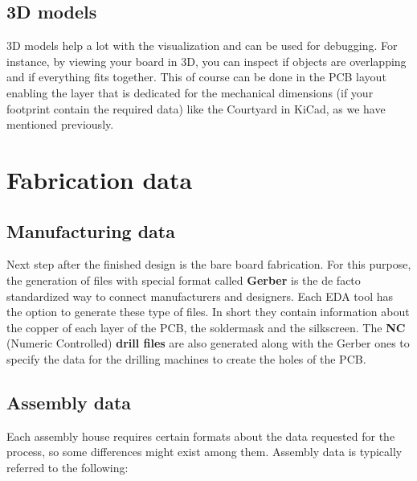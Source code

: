 \documentclass[final]{cubedoc}
\begin{document}
	
	\subsection{3D models}
	
	3D models help a lot with the visualization and can be used for debugging. For instance, by viewing your board in 3D, you can inspect if objects are overlapping and if everything fits together. This of course can be done in the PCB layout enabling the layer that is dedicated for the mechanical dimensions (if your footprint contain the required data) like the Courtyard in KiCad, as we have mentioned previously.
	
	\section{Fabrication data}
	
	\subsection{Manufacturing data}
	
	Next step after the finished design is the bare board fabrication. For this purpose, the generation of files with special format called \textbf{Gerber} is the de facto standardized way to connect manufacturers and designers. Each EDA tool has the option to generate these type of files. In short they contain information about the copper of each layer of the PCB, the soldermask and the silkscreen. The \textbf{NC} (Numeric Controlled) \textbf{drill files} are also generated along with the Gerber ones to specify the data for the drilling machines to create the holes of the PCB.
	
	
	\subsection{Assembly data}
	
	Each assembly house requires certain formats about the data requested for the process, so some differences might exist among them. Assembly data is typically referred to the following:
	
\end{document}
